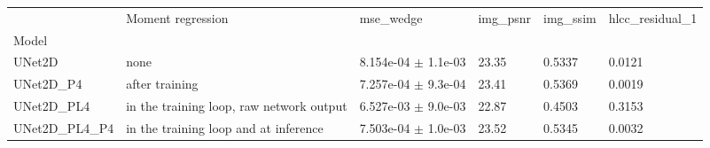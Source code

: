 \begin{tabular}{llllll}
\toprule
 & Moment regression & mse\_wedge & img\_psnr & img\_ssim & hlcc\_residual\_1 \\
Model &  &  &  &  &  \\
\midrule
UNet2D & none & 8.154e-04 $\pm$ 1.1e-03 & 23.35 & 0.5337 & 0.0121 \\
UNet2D\_P4 & after training & 7.257e-04 $\pm$ 9.3e-04 & 23.41 & 0.5369 & 0.0019 \\
UNet2D\_PL4 & in the training loop, raw network output & 6.527e-03 $\pm$ 9.0e-03 & 22.87 & 0.4503 & 0.3153 \\
UNet2D\_PL4\_P4 & in the training loop and at inference & 7.503e-04 $\pm$ 1.0e-03 & 23.52 & 0.5345 & 0.0032 \\
\bottomrule
\end{tabular}
